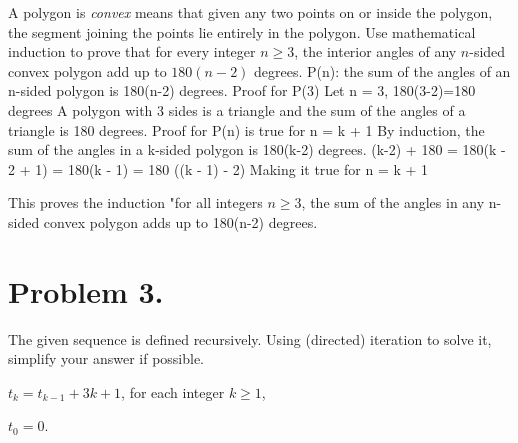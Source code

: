\documentclass[11pt]{article}
\begin{document}
\noindent
A polygon is {\em convex} means that given any two points on or inside the polygon, the segment joining the points lie entirely in the polygon.
Use mathematical induction to prove that for every integer $n\geq 3$, the interior angles of any $n$-sided convex polygon add up to $180(n-2)$ degrees.
\newline
\newline
P(n): the sum of the angles of an n-sided polygon is 180(n-2) degrees.
\newline
Proof for P(3)
\newline
Let n = 3, 180(3-2)=180 degrees
\newline
A polygon with 3 sides is a triangle and the sum of the angles of a triangle is 180 degrees.
\newline
\newline
Proof for P(n) is true for n = k + 1
\newline
By induction, the sum of the angles in a k-sided polygon is 180(k-2) degrees. 
\newline
{}(k-2) + 180 = 180(k - 2 + 1) = 180(k - 1) = 180 ((k - 1) - 2)
\newline
Making it true for n = k + 1
\newline
\newline

This proves the induction "for all integers $n \geq 3$, the sum of the angles in any n-sided convex polygon adds up to 180(n-2) degrees.


\newpage

\section*{Problem 3.}

The given sequence is defined recursively. Using (directed) iteration to solve it, simplify your answer if possible.

$t_k=t_{k-1}+3k+1$, for each integer $k\geq 1$,

$t_0=0$.
\newline
\end{document}

